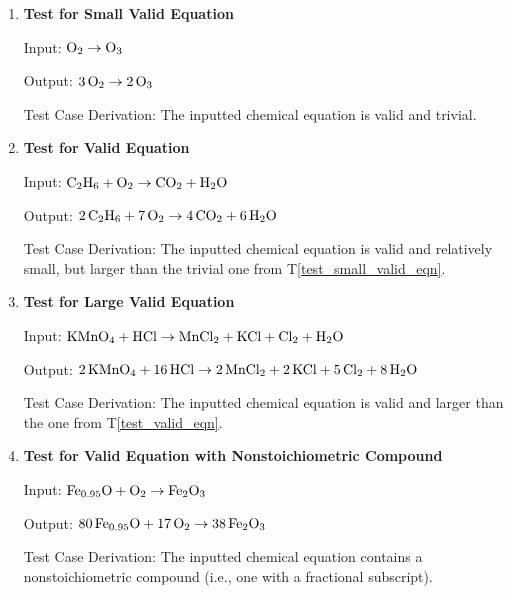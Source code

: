 \documentclass[12pt, titlepage]{article}
\newcounter{testnum} %
\newcommand{\testref}[1]{T\ref{#1}}
\begin{document}
\begin{enumerate}

  \item[T\refstepcounter{testnum}\thetestnum \label{test_small_valid_eqn}:]
    \textbf{Test for Small Valid Equation}

    Input: $\ce{O2} \rightarrow \ce{O3}$ \cite{fahey_twenty_2011}

    Output: $\ce{3O2} \rightarrow \ce{2O3}$ \cite[p.~6]{fahey_twenty_2011}

    Test Case Derivation: The inputted chemical equation is
    valid and trivial.

  \item[T\refstepcounter{testnum}\thetestnum \label{test_valid_eqn}:]
    \textbf{Test for Valid Equation}

    Input: $\ce{C2H6} + \ce{O2} \rightarrow \ce{CO2} + \ce{H2O}$
    \cite{hamid_balancing_2019}

    Output: $\ce{2C2H6} + \ce{7O2} \rightarrow \ce{4CO2} + \ce{6H2O}$
    \cite[p.~523]{hamid_balancing_2019}

    Test Case Derivation: The inputted chemical equation is valid and
    relatively small, but larger than the trivial one from
    \testref{test_small_valid_eqn}.

  \item[T\refstepcounter{testnum}\thetestnum \label{test_large_valid_eqn}:]
    \textbf{Test for Large Valid Equation}

    Input: $\ce{KMnO4} + \ce{HCl} \rightarrow \ce{MnCl2} + \ce{KCl} +
      \ce{Cl2} + \ce{H2O}$ \cite{taylor_balancing_2021}

    Output: $\ce{2KMnO4} + \ce{16HCl} \rightarrow \ce{2MnCl2} + \ce{2KCl} +
      \ce{5Cl2} + \ce{8H2O}$ \cite{taylor_balancing_2021}

    Test Case Derivation: The inputted chemical equation is
    valid and larger than the one from \testref{test_valid_eqn}.

  \item[T\refstepcounter{testnum}\thetestnum \label{test_nonstoich_valid_eqn}:]
    \textbf{Test for Valid Equation with Nonstoichiometric Compound}

    Input: $\ce{Fe_{0.95}O} + \ce{O2} \rightarrow \ce{Fe2O3}$
    \cite{doubtnut_when_nodate}

    Output: $\ce{80Fe_{0.95}O} + \ce{17O2} \rightarrow \ce{38Fe2O3}$

    Test Case Derivation: The inputted chemical equation contains a
    nonstoichiometric compound (i.e., one with a fractional subscript).

\end{enumerate}
\end{document}
